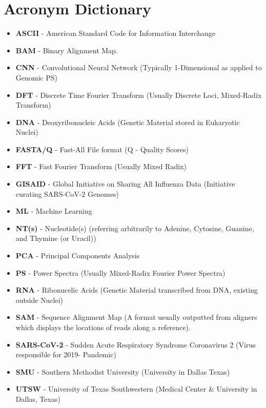\documentclass[12pt,conference]{IEEEtran}
\begin{document}
\section{Acronym Dictionary} 
{\tiny
\begin{itemize} 
\item \textbf{ASCII} - American Standard Code for Information Interchange
\item \textbf{BAM} - Binary Alignment Map. 
\item \textbf{CNN} - Convolutional Neural Network (Typically 1-Dimensional as applied to Genomic PS)
\item \textbf{DFT} - Discrete Time Fourier Transform (Usually Discrete Loci, Mixed-Radix Transform)
\item \textbf{DNA} - Deoxyribonucleic Acids (Genetic Material stored in Eukaryotic Nuclei)
\item \textbf{FASTA/Q} - Fast-All File format (Q - Quality Scores)
\item \textbf{FFT} - Fast Fourier Transform (Usually Mixed Radix)
\item \textbf{GISAID} - Global Initiative on Sharing All Influenza Data (Initiative curating SARS-CoV-2 Genomes)
\item \textbf{ML} - Machine Learning
\item \textbf{NT(s)} - Nucleotide(s) (referring arbitrarily to Adenine, Cytosine, Guanine, and Thymine (or Uracil))
\item \textbf{PCA} - Principal Components Analysis
\item \textbf{PS} - Power Spectra (Usually Mixed-Radix Fourier Power Spectra)
\item \textbf{RNA} - Ribonucelic Acids (Genetic Material transcribed from DNA, existing outside Nuclei)
\item \textbf{SAM} - Sequence Alignment Map (A format usually outputted from aligners which displays the locations of reads along a reference). 
\item \textbf{SARS-CoV-2} - Sudden Acute Respiratory Syndrome Coronavirus 2 (Virus responsible for 2019- Pandemic)
\item \textbf{SMU} - Southern Methodist University (University in Dallas Texas) 
\item \textbf{UTSW} - University of Texas Southwestern (Medical Center \& University in Dallas, Texas)
\end{itemize}
}
\end{document}

